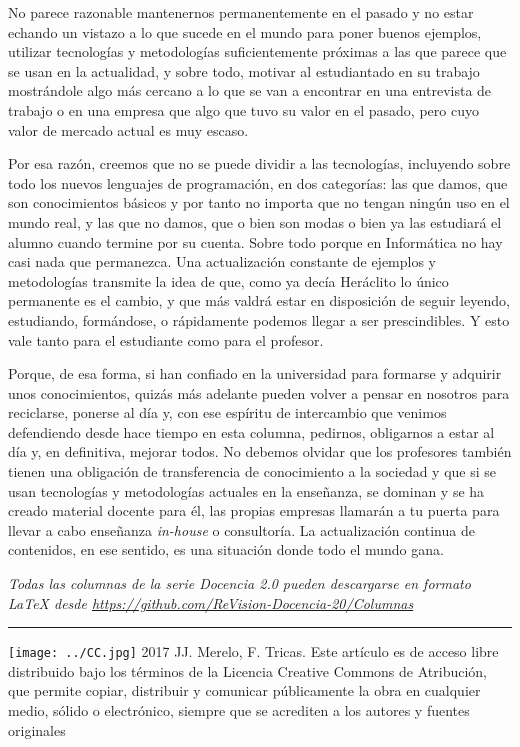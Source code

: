 \documentclass[twoside,10pt]{article}
\newcommand{\surl}[1]{{\small\url{#1}}}
\newcounter{vol}
\begin{document}
\begin{multicols}{2}
No parece razonable mantenernos permanentemente en el pasado y no estar
echando un vistazo a lo que sucede en el mundo para poner
buenos ejemplos, utilizar tecnologías y metodologías suficientemente próximas
a las que parece que se usan en la actualidad, y sobre todo,
motivar al estudiantado en su trabajo mostrándole algo más cercano a
lo que se van a encontrar en una entrevista de trabajo o en una
empresa que algo que tuvo su valor en el pasado, pero cuyo valor de
mercado actual es muy escaso. 

Por esa razón, creemos que no se puede dividir a
las tecnologías, incluyendo sobre todo los nuevos lenguajes de
programación, en dos categorías: las que damos, que son
conocimientos básicos y por tanto no importa que no tengan
ningún uso en el mundo real, y las que no damos, que o bien
son modas o bien ya las estudiará el alumno cuando termine por
su cuenta. Sobre todo porque en Informática no hay casi nada que permanezca. Una
actualización constante de ejemplos y metodologías transmite la idea
de que, como ya decía Heráclito lo único permanente es el cambio, y
que más valdrá estar en disposición de seguir leyendo, estudiando,
formándose, o rápidamente podemos llegar a ser prescindibles.  Y esto
vale tanto para el estudiante como para el profesor. 

Porque, de esa forma, si han confiado en la universidad para formarse
y adquirir unos conocimientos, quizás más adelante pueden volver a
pensar en nosotros para reciclarse, ponerse al día y, con ese espíritu
de intercambio que venimos defendiendo desde hace tiempo en esta
columna, pedirnos, obligarnos a estar al día y, en definitiva, mejorar
todos. No debemos olvidar que los profesores también tienen una
obligación de transferencia de conocimiento a la sociedad y que si se
usan tecnologías y metodologías actuales en la enseñanza, se dominan y
se ha creado material docente para él, las propias empresas llamarán a
tu puerta para llevar a cabo enseñanza {\em in-house} o
consultoría. La actualización continua de contenidos, en ese sentido,
es una situación donde todo el mundo gana. 


\noindent\emph{Todas las columnas de la serie Docencia 2.0
pueden descargarse en formato LaTeX desde
\surl{https://github.com/ReVision-Docencia-20/Columnas}}

\noindent\rule{90mm}{1pt}

{\small \noindent\texttt{[image: ../CC.jpg]} 2017 JJ. Merelo, F. Tricas. Este artículo es de acceso libre distribuido bajo los términos
de la Licencia Creative Commons de Atribución, que permite copiar,
distribuir y comunicar públicamente la obra en cualquier medio, sólido
o electrónico, siempre que se acrediten a los autores y fuentes
originales}

\end{multicols}
\end{document}
